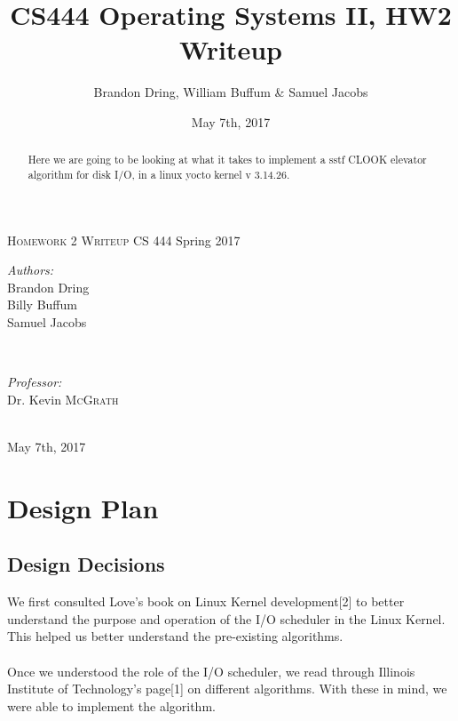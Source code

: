 \documentclass{article}
\title{CS444 Operating Systems II, HW2 Writeup}
\author{Brandon Dring, William Buffum \& Samuel Jacobs}
\date{May 7th, 2017}
\begin{document}
\begin{titlepage}

\center

\textsc{\LARGE Homework 2 Writeup} \newline \newline
{\large CS 444 Spring 2017}



\begin{minipage}{0.4\textwidth}
   \begin{flushleft} \large
      \emph{Authors:}\\
      Brandon Dring \\
      Billy Buffum \\
      Samuel Jacobs
   \end{flushleft}
\end{minipage}
~
\begin{minipage}{0.4\textwidth}
   \begin{flushright} \large
      \emph{Professor:} \\
      Dr. Kevin \textsc{McGrath} %
   \end{flushright}
\end{minipage} \\ [4cm]

{\large May 7th, 2017}
\vfill %

\begin{abstract}
    Here we are going to be looking at what it takes to implement a sstf CLOOK elevator algorithm for disk I/O, in a linux yocto kernel v 3.14.26.
\end{abstract}


\pagebreak

\end{titlepage}
\newpage


\section{Design Plan}
    \subsection{Design Decisions}
    We first consulted Love's book on Linux Kernel development[2] to better understand the purpose and operation of the I/O scheduler in the Linux Kernel.  This helped us better understand the pre-existing algorithms.\\\\
    Once we understood the role of the I/O scheduler, we read through Illinois Institute of Technology's page[1] on different algorithms.  With these in mind, we were able to implement the algorithm.
\end{document}
